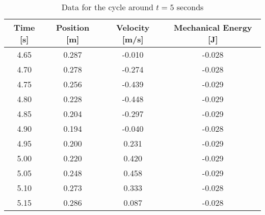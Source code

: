 \documentclass{article}
\begin{document}
            \begin{table}[H]
                \centering
                \begin{tabular}{|c|c|c|c|}
                    \hline
                    Time [s] & Position [m] & Velocity [m/s] & Mechanical Energy [J] \\
                    \hline
                    4.65     & 0.287        & -0.010         & -0.028                \\
                    \hline
                    4.70     & 0.278        & -0.274         & -0.028                \\
                    \hline
                    4.75     & 0.256        & -0.439         & -0.029                \\
                    \hline
                    4.80     & 0.228        & -0.448         & -0.029                \\
                    \hline
                    4.85     & 0.204        & -0.297         & -0.029                \\
                    \hline
                    4.90     & 0.194        & -0.040         & -0.028                \\
                    \hline
                    4.95     & 0.200        & 0.231          & -0.029                \\
                    \hline
                    5.00     & 0.220        & 0.420          & -0.029                \\
                    \hline
                    5.05     & 0.248        & 0.458          & -0.029                \\
                    \hline
                    5.10     & 0.273        & 0.333          & -0.028                \\
                    \hline
                    5.15     & 0.286        & 0.087          & -0.028                \\
                    \hline
                \end{tabular} %
                \caption{Data for the cycle around $t=5$ seconds}\label{tab:cycle-around-5-seconds-mechanical-energy-table}
            \end{table}
            
\end{document}
